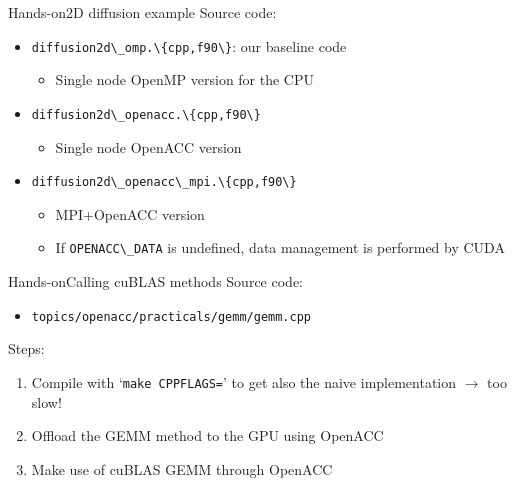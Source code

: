 \documentclass[12pt,aspectratio=169]{beamer}
\newcommand\shinline[2][]{\lstinline[style=shstyle,basicstyle=\ttfamily,#1]!#2!}
\begin{document}
\begin{frame}[fragile]{Hands-on}{2D diffusion example}
  Source code:
  \begin{itemize}
  \item \shinline{diffusion2d\_omp.\{cpp,f90\}}: our baseline code
    \begin{itemize}
    \item Single node OpenMP version for the CPU
    \end{itemize}
  \item \shinline{diffusion2d\_openacc.\{cpp,f90\}}
    \begin{itemize}
    \item Single node OpenACC version
    \end{itemize}
  \item \shinline{diffusion2d\_openacc\_mpi.\{cpp,f90\}}
    \begin{itemize}
    \item MPI+OpenACC version
    \item If \shinline{OPENACC\_DATA} is undefined, data management is performed by CUDA
    \end{itemize}
  \end{itemize}
\end{frame}

\begin{frame}[fragile]{Hands-on}{Calling cuBLAS methods}
  Source code:
  \begin{itemize}
  \item \shinline{topics/openacc/practicals/gemm/gemm.cpp}
  \end{itemize}
  \vfill
  Steps:
  \begin{enumerate}
  \item Compile with `\shinline{make CPPFLAGS=}' to get also the naive implementation $\rightarrow$ too slow!
  \item Offload the GEMM method to the GPU using OpenACC
  \item Make use of cuBLAS GEMM through OpenACC
  \end{enumerate}
\end{frame}


\end{document}
